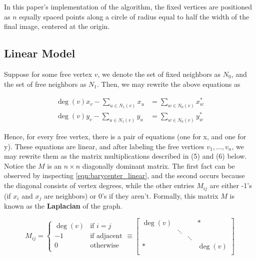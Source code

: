 \documentclass[11pt]{report}
\begin{document}
In this paper's implementation of the algorithm, the fixed vertices are positioned as $n$ equally spaced points along a circle of radius equal to half the width of the final image, centered at the origin.

\subsection{Linear Model}
Suppose for some free vertex $v$, we denote the set of fixed neighbors as $N_0$, and the set of free neighbors as $N_1$. Then, we may rewrite the above equations as

\begin{equation}\label{eqn:barycenter_linear}
    \begin{aligned}
        \deg{(v)}x_v - \sum_{u \in N_1(v)} x_u &= \sum_{w \in N_0(v)} x^*_w \\
        \deg{(v)}y_v - \sum_{u \in N_1(v)} y_u &= \sum_{w \in N_0(v)} y^*_w
    \end{aligned}
\end{equation}

Hence, for every free vertex, there is a pair of equations (one for x, and one for y). These equations are linear, and after labeling the free vertices $v_1, ..., v_n$, we may rewrite them as the matrix multiplications described in (5) and (6) below. Notice the $M$ is an $n \times n$ diagonally dominant matrix. The first fact can be observed by inspecting \ref{eqn:barycenter_linear}, and the second occurs because the diagonal consists of vertex degrees, while the other entries $M_{ij}$ are either -1's (if $x_i$ and $x_j$ are neighbors) or 0's if they aren't. Formally, this matrix $M$ is known as the \textbf{Laplacian} of the graph.

\begin{equation}\label{eqn:barycenter_matrix}
    M_{ij} = \begin{cases}
    \deg(v) &{\text{if $i = j$}} \\
    -1      &{\text{if adjacent}} \\
    0       &{\text{otherwise}} \\
    \end{cases}
    \equiv
    \begin{bmatrix}
    \deg(v) &        &        & * \\
            & \ddots &        & \\
            &        & \ddots & \\
    *       &        &        & \deg(v) \\
    \end{bmatrix}
\end{equation}
\end{document}
